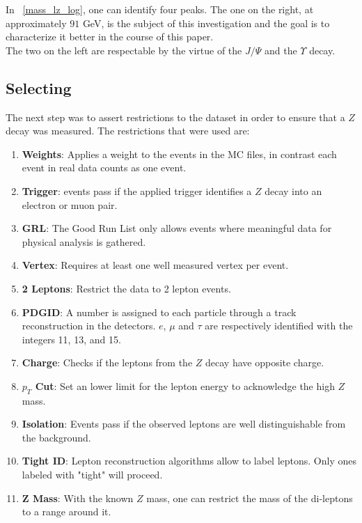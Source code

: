 \documentclass[12pt, a4paper, bibliography=totoc]{scrartcl}
\begin{document}
\begin{multicols}{2}
In ~\ref{mass_lz_log}, one can identify four peaks. 
The one on the right, at approximately $91$ \si{GeV}, is the subject of this investigation and the goal is to characterize it better in the course of this paper.\\
The two on the left are respectable by the virtue of the $J/{\Psi}$ and the $\Upsilon$ decay. 

\subsection{Selecting} 
The next step was to assert restrictions to the dataset in order to ensure that a $Z$ decay was measured.
The restrictions that were used are:
\begin{enumerate}
    \item \textbf{Weights}: Applies a weight to the events in the MC files, in contrast each event in real data counts as one event.
    \item \textbf{Trigger}: events pass if the applied trigger identifies a $Z$ decay into an electron or muon pair.
    \item \textbf{GRL}: The Good Run List only allows events where meaningful data for physical analysis is gathered.
    \item \textbf{Vertex}: Requires at least one well measured vertex per event.
    \item \textbf{2 Leptons}: Restrict the data to 2 lepton events.
    \item \textbf{PDGID}: A number is assigned to each particle through a track reconstruction in the detectors. $e$, $\mu$ and $\tau$ are respectively identified with the integers 11, 13, and 15.
    \item \textbf{Charge}: Checks if the leptons from the $Z$ decay have opposite charge.
    \item \textbf{$p_{T}$ Cut}: Set an lower limit for the lepton energy to acknowledge the high $Z$ mass.
    \item \textbf{Isolation}: Events pass if the observed leptons are well distinguishable from the background.
    \item \textbf{Tight ID}: Lepton reconstruction algorithms allow to label leptons. Only ones labeled with "tight" will proceed.
    \item \textbf{Z Mass}: With the known $Z$ mass, one can restrict the mass of the di-leptons to a range around it. 
\end{enumerate}


\end{multicols}
\end{document}
